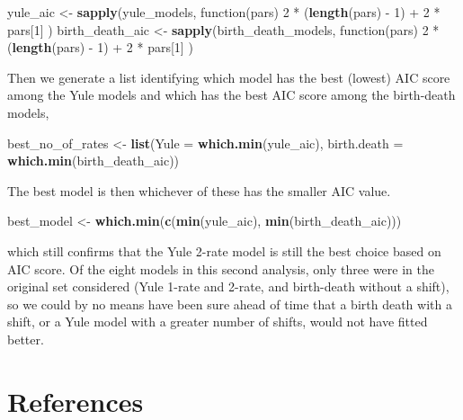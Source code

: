 \documentclass[author-year, review, 12pt]{elsarticle} %
\newenvironment{Shaded}{}{}
\newcommand{\KeywordTok}[1]{\textcolor[rgb]{0.00,0.44,0.13}{\textbf{{#1}}}}
\newcommand{\DataTypeTok}[1]{\textcolor[rgb]{0.56,0.13,0.00}{{#1}}}
\newcommand{\DecValTok}[1]{\textcolor[rgb]{0.25,0.63,0.44}{{#1}}}
\newcommand{\NormalTok}[1]{{#1}}
\begin{document}
\begin{Shaded}
\begin{Highlighting}[]
\NormalTok{yule_aic <- }
\KeywordTok{sapply}\NormalTok{(yule_models, function(pars)}
                    \DecValTok{2} \NormalTok{* (}\KeywordTok{length}\NormalTok{(pars) - }\DecValTok{1}\NormalTok{) + }\DecValTok{2} \NormalTok{* pars[}\DecValTok{1}\NormalTok{] )}
\NormalTok{birth_death_aic <- }
\KeywordTok{sapply}\NormalTok{(birth_death_models, function(pars)}
                            \DecValTok{2} \NormalTok{* (}\KeywordTok{length}\NormalTok{(pars) - }\DecValTok{1}\NormalTok{) + }\DecValTok{2} \NormalTok{* pars[}\DecValTok{1}\NormalTok{] )}
\end{Highlighting}
\end{Shaded}
Then we generate a list identifying which model has the best (lowest)
AIC score among the Yule models and which has the best AIC score among
the birth-death models,

\begin{Shaded}
\begin{Highlighting}[]
\NormalTok{best_no_of_rates <- }\KeywordTok{list}\NormalTok{(}\DataTypeTok{Yule =} \KeywordTok{which.min}\NormalTok{(yule_aic), }
                         \DataTypeTok{birth.death =} \KeywordTok{which.min}\NormalTok{(birth_death_aic))}
\end{Highlighting}
\end{Shaded}
The best model is then whichever of these has the smaller AIC value.

\begin{Shaded}
\begin{Highlighting}[]
\NormalTok{best_model <- }\KeywordTok{which.min}\NormalTok{(}\KeywordTok{c}\NormalTok{(}\KeywordTok{min}\NormalTok{(yule_aic), }\KeywordTok{min}\NormalTok{(birth_death_aic)))}
\end{Highlighting}
\end{Shaded}
which still confirms that the Yule 2-rate model is still the best choice
based on AIC score. Of the eight models in this second analysis, only
three were in the original set considered (Yule 1-rate and 2-rate, and
birth-death without a shift), so we could by no means have been sure
ahead of time that a birth death with a shift, or a Yule model with a
greater number of shifts, would not have fitted better.

\section{References}
\end{document}
